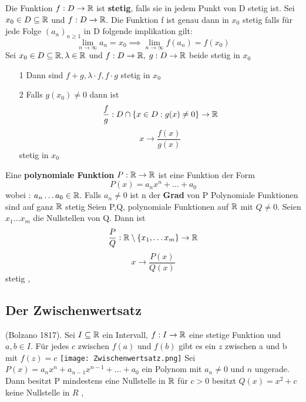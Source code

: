\Def[3.5] Die Funktion \(f : D \rightarrow \mathbb{R}\) ist \textbf{stetig}, falls sie in jedem Punkt von D stetig ist. \newline
\Satz[3.7] Sei \(x_0 \in D \subseteq \mathbb{R} \) und \(f: D \rightarrow \mathbb{R} \). Die Funktion f ist genau dann in \(x_0\) stetig falls für jede Folge \((a_n)_{n \geq 1}\) in D folgende implikation gilt:
\[\lim\limits_{n \rightarrow \infty} a_n = x_0 \implies \lim\limits_{n \rightarrow \infty} f(a_n) = f(x_0)\]
\Korollar[3.8] Sei \(x_0 \in D \subseteq \mathbb{R}, \lambda \in \mathbb{R} \) und \(f : D \rightarrow \mathbb{R}, \) \newline \( g: D \rightarrow \mathbb{R}\) beide stetig in \(x_0\)
\begin{enumerate}
    \item [1] Dann sind \(f+g, \lambda \cdot f, f \cdot g\) stetig in \(x_0\)
    \item [2] Falls \(g(x_0) \neq 0\) dann ist
    \[ \frac{f}{g} : D \cap \{x \in D : g(x) \neq 0\} \rightarrow \mathbb{R}\]
    \[x \rightarrow \frac{f(x)}{g(x)}\] stetig in \(x_0\)
\end{enumerate}
\Def[3.9] Eine \textbf{polynomiale Funktion} \(P: \mathbb{R} \rightarrow \mathbb{R}\) ist eine Funktion der Form
\[P(x) = a_nx^n + \dots + a_0\]
wobei : \(a_n \dots a_0 \in \mathbb{R}\). Falls \(a_n \neq 0\) ist n der \textbf{Grad} von P \newline
\Korollar[3.10] Polynomiale Funktionen sind auf ganz \(\mathbb{R}\) stetig \newline
\Korollar[3.11] Seien P,Q, polynomiale Funktionen auf \(\mathbb{R}\) mit \(Q \neq 0\). Seien \(x_1 \dots x_m\) die Nullstellen von Q. Dann ist
\[\frac{P}{Q} : \mathbb{R} \setminus \{x_1, \dots x_m\} \rightarrow \mathbb{R} \]
\[x \rightarrow \frac{P(x)}{Q(x)}\] stetig
\sep
\subsection{Der Zwischenwertsatz}
\Satz[3.12] (Bolzano 1817). Sei \(I \subseteq \mathbb{R} \) ein Intervall, \(f : I \rightarrow \mathbb{R} \) eine stetige Funktion und \(a,b \in I\). Für jedes \(c\) zwischen \(f(a)\) und \(f(b)\) gibt es ein \(z\) zwischen a und b mit \(f(z) = c\) \newline
\texttt{[image: Zwischenwertsatz.png]}
\Korollar[3.13] Sei \(P(x) = a_nx^n + a_{n-1}x^{n-1} + \dots + a_0\) ein Polynom mit \(a_n \neq 0\) und \(n\) ungerade. Dann besitzt P mindestens eine Nullstelle in \(\mathbb{R}\) \newline
\Bem[3.14] für \(c > 0\) besitzt \(Q(x) = x^2 + c\) keine Nullstelle in \(R\) \newline
\sep
